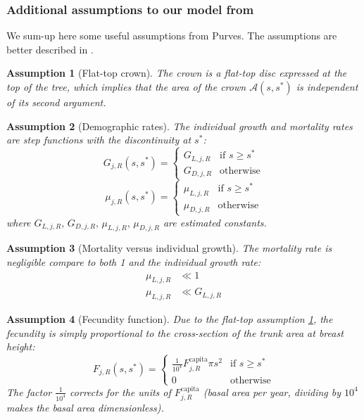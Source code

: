 \documentclass[letterpaper, 12pt]{article}
\newcommand {\s}{{s}^{*}}
\newcommand {\A}{\mathscr{A}}
\theoremstyle{theo}
\newtheorem{assum}{Assumption}[section]
\begin{document}
\begin{refsection}
\begin{onehalfspace}
\subsubsection{Additional assumptions to our model from \citet{Purves2009}}
We sum-up here some useful assumptions from Purves. The assumptions are better described in \citet[not to confound with 2009's paper]{Purves2008}.
\begin{assum}[Flat-top crown] \label{assum::flat-top}
	The crown is a flat-top disc expressed at the top of the tree, which implies that the area of the crown $ \A(s, \s) $ is independent of its second argument.
\end{assum}

\begin{assum}[Demographic rates]
	The individual growth and mortality rates are step functions with the discontinuity at $ \s $:
	\[
		G_{j, R}(s, \s) =
		\begin{cases}
			G_{L, j, R} & \text{if } s \geqslant \s \\
			G_{D, j, R} & \text{otherwise}
		\end{cases}
	\]
	\[
	\mu_{j, R}(s, \s) =
		\begin{cases}
			\mu_{L, j, R} & \text{if } s \geqslant \s \\
			\mu_{D, j, R} & \text{otherwise}
		\end{cases}
	\]
	where $ G_{L, j, R}, \, G_{D, j, R}, \, \mu_{L, j, R}, \, \mu_{D, j, R} $ are estimated constants.
\end{assum}

\begin{assum}[Mortality versus individual growth] \label{assum::negligible}
	The mortality rate is negligible compare to both 1 and the individual growth rate:
	\begin{align}
		\mu_{L, j, R} &\ll 1 \\
		\mu_{L, j, R} &\ll G_{L, j, R}
	\end{align}
\end{assum}

\begin{assum}[Fecundity function]
	Due to the flat-top assumption \ref{assum::flat-top}, the fecundity is simply proportional to the cross-section of the trunk area at breast height:
	\[
		F_{j, R} (s, \s) =
		\begin{cases}
			\frac{1}{10^4} F_{j, R}^{\text{capita}} \pi s^2 & \text{if } s \geqslant \s \\
			0 & \text{otherwise}
		\end{cases}
	\]
	The factor $ \frac{1}{10^4} $ corrects for the units of $ F_{j, R}^{\text{capita}} $ (basal area per year, dividing by $ 10^4 $ makes the basal area dimensionless).
\end{assum}


\end{onehalfspace}
\end{refsection}
\end{document}
